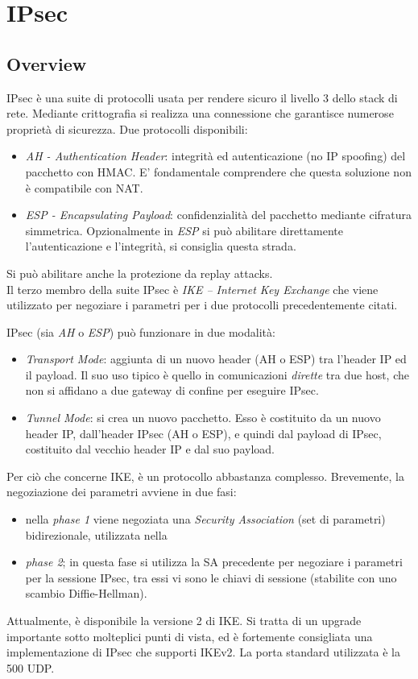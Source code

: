 \section{IPsec}
\subsection{Overview}
IPsec è una suite di protocolli usata per rendere sicuro il livello 3 dello stack di
rete. Mediante crittografia si realizza una connessione che garantisce
numerose proprietà di sicurezza. Due protocolli disponibili:
\begin{itemize}
  \item \textit{AH - Authentication Header}: integrità ed autenticazione (no IP spoofing) del pacchetto con HMAC.
  E' fondamentale comprendere che questa soluzione non è compatibile con NAT.
  \item \textit{ESP - Encapsulating Payload}: confidenzialità del pacchetto mediante cifratura simmetrica.
  Opzionalmente in \textit{ESP} si può abilitare direttamente l'autenticazione e l'integrità,
  si consiglia questa strada.
\end{itemize}
Si può abilitare anche la protezione da replay attacks.\\

Il terzo membro della suite IPsec è \textit{IKE -- Internet Key Exchange} che viene
utilizzato per negoziare i parametri per i due protocolli precedentemente citati.

IPsec (sia \textit{AH} o \textit{ESP}) può funzionare in due modalità:
\begin{itemize}
  \item \textit{Transport Mode}: aggiunta di un nuovo header (AH o ESP) tra l'header IP
  ed il payload.
  Il suo uso tipico è quello in comunicazioni \textit{dirette} tra due host, che non si affidano a
  due gateway di confine per eseguire IPsec.
  \item \textit{Tunnel Mode}: si crea un nuovo pacchetto. Esso è costituito da
  un nuovo header IP, dall'header IPsec (AH o ESP), e quindi dal payload di IPsec, costituito dal
  vecchio header IP e dal suo payload.
\end{itemize}

Per ciò che concerne IKE, è un protocollo abbastanza complesso. Brevemente, la negoziazione
dei parametri avviene in due fasi:
\begin{itemize}
  \item nella \textit{phase 1} viene negoziata una \textit{Security Association} (set di parametri)
  bidirezionale, utilizzata nella
  \item \textit{phase 2}; in questa fase si utilizza la SA precedente per negoziare i
  parametri per la sessione IPsec, tra essi vi sono le chiavi di sessione (stabilite con
  uno scambio Diffie-Hellman).
\end{itemize}
Attualmente, è disponibile la versione 2 di IKE. Si tratta di un upgrade importante sotto molteplici punti
di vista, ed è fortemente consigliata una implementazione di IPsec che supporti IKEv2.
La porta standard utilizzata è la 500 UDP.


